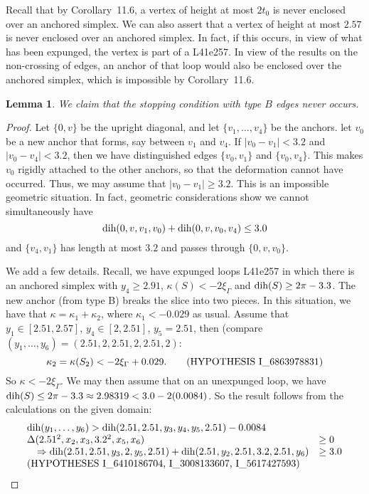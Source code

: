 \documentclass[11pt]{amsart}
\def\op#1{{\text{#1}}}
\def\text{\hbox}
\newtheorem{lemma}[subsubsection]{Lemma}
\begin{document}
Recall that by Corollary~11.6, a vertex of height at most $2t_0$ is
never enclosed over an anchored simplex.  We can also assert that
a vertex of height at most $2.57$ is never enclosed over an anchored
simplex.  In fact, if this occurs, in view of what has been expunged,
the vertex is part of a L41e257.  In view of the results on the non-crossing
of edges, an anchor of that loop  would also be enclosed over the
anchored simplex, which is impossible by Corollary~11.6.

\begin{lemma}
We claim that the stopping condition with type
$B$ edges never occurs.
\end{lemma}

\begin{proof}
Let $\{0,v\}$ be the upright diagonal, and let $\{v_1,\ldots,v_4\}$ be the anchors.  let $v_0$ be a new anchor that forms, say between $v_1$ and $v_4$.  If $|v_0-v_1|< 3.2$ and $|v_0-v_4|<3.2$, then we have distinguished edges $\{v_0,v_1\}$ and $\{v_0,v_4\}$.  This makes $v_0$ rigidly attached to the other anchors, so that the deformation cannot have occurred.  Thus, we may assume that $|v_0-v_1|\ge 3.2$.  This is an impossible geometric situation.  In fact, geometric considerations show we cannot simultaneously have
  $$
  \op{dih}(0,v,v_1,v_0) + \op{dih}(0,v,v_0,v_4)\le 3.0
  $$
and $\{v_4,v_1\}$ has length at most $3.2$ and passes through $\{0,v,v_0\}$.  

We add a few details.  Recall, we have expunged loops L41e257 in which there is an anchored simplex with $y_4\ge 2.91$, $\kappa(S)<-2\xi_\Gamma$ and $\op{dih}(S)\ge 2\pi-3.3$.  The new anchor (from type B) breaks the slice into two
pieces.  
In this situation, we have that $\kappa = \kappa_1 + \kappa_2$, where $\kappa_1 < -0.029$ as usual.  Assume that
$y_1\in[2.51,2.57]$, $y_4\in[2,2.51]$, $y_5=2.51$, then (compare $(y_1,\ldots,y_6) = (2.51,2,2.51,2,2.51,2)$: 
   $$\kappa_2 =\kappa(S_2) < -2\xi_\Gamma + 0.029.\qquad 
      \text{(HYPOTHESIS I\_6863978831)}$$
So $\kappa < -2\xi_\Gamma$.  We may then assume that on an unexpunged
loop, we have $\op{dih}(S)\le 2\pi-3.3\approx 2.98319 < 3.0 - 2(0.0084)$.
So the result follows from the calculations on the given domain:
    $$
    \begin{array}{lllll}
    \op{dih}(y_1,\ldots,y_6) > \op{dih}(2.51,2.51,y_3,y_4,y_5,2.51) - 0.0084&\\
    \Delta(2.51^2,x_2,x_3,3.2^2,x_5,x_6) &\ge 0 \\ \quad \Rightarrow 
    \op{dih}(2.51,2.51,y_3,2,y_5,2.51) + \op{dih}(2.51,y_2,2.51,3.2,2.51,y_6) &\ge 3.0\\
    \text{(HYPOTHESES I\_6410186704, I\_3008133607, I\_5617427593)}
    \end{array} 
    $$
\end{proof}
\end{document}
